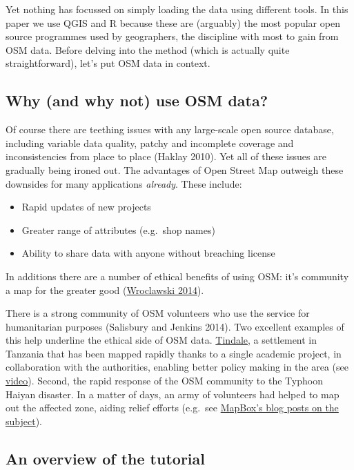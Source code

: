 \documentclass[]{article}
\begin{document}
Yet nothing has focussed on simply loading the data using different
tools. In this paper we use QGIS and R because these are (arguably) the
most popular open source programmes used by geographers, the discipline
with most to gain from OSM data. Before delving into the method (which
is actually quite straightforward), let's put OSM data in context.

\subsection{Why (and why not) use OSM data?}

Of course there are teething issues with any large-scale open source
database, including variable data quality, patchy and incomplete
coverage and inconsistencies from place to place (Haklay 2010). Yet all
of these issues are gradually being ironed out. The advantages of Open
Street Map outweigh these downsides for many applications
\emph{already}. These include:

\begin{itemize}
\item
  Rapid updates of new projects
\item
  Greater range of attributes (e.g.~shop names)
\item
  Ability to share data with anyone without breaching license
\end{itemize}

In additions there are a number of ethical benefits of using OSM: it's
community a map for the greater good
(\href{http://www.theguardian.com/technology/2014/jan/14/why-the-world-needs-openstreetmap}{Wroclawski
2014}).

There is a strong community of OSM volunteers who use the service for
humanitarian purposes (Salisbury and Jenkins 2014). Two excellent
examples of this help underline the ethical side of OSM data.
\href{http://explore.ramanitanzania.org/}{Tindale}, a settlement in
Tanzania that has been mapped rapidly thanks to a single academic
project, in collaboration with the authorities, enabling better policy
making in the area (see
\href{http://www.youtube.com/watch?v=KqrGyvNnWkA}{video}). Second, the
rapid response of the OSM community to the Typhoon Haiyan disaster. In a
matter of days, an army of volunteers had helped to map out the affected
zone, aiding relief efforts (e.g.~see
\href{https://www.mapbox.com/blog/typhoon-haiyan-openstreetmap/}{MapBox's
blog posts on the subject}).

\subsection{An overview of the tutorial}
\end{document}
